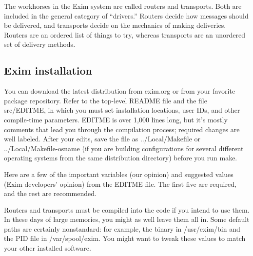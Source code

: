 The workhorses in the Exim system are called routers and transports.
Both are included in the general category of ``drivers.'' Routers decide
how messages should be delivered, and transports decide on the mechanics
of making deliveries. Routers are an ordered list of things to try,
whereas transports are an unordered set of delivery methods.

\protect\hypertarget{part0026_split_041.html}{}{}

\hypertarget{part0026_split_041.htmlux5cux23_idContainer1247}{}
\hypertarget{part0026_split_041.htmlux5cux23calibre_pb_40}{%
\subsection[Exim
installation]{\texorpdfstring{\protect\hypertarget{part0026_split_041.htmlux5cux23_idTextAnchor1127}{}{}Exim
installation}{Exim installation}}\label{part0026_split_041.htmlux5cux23calibre_pb_40}}

\protect\hypertarget{part0026_split_041.htmlux5cux23_idIndexMarker2610}{}{}You
can download the latest distribution from exim.org or from your favorite
package repository. Refer to the top-level {README} file and the file
{src/EDITME}, in which you must set installation locations, user IDs,
and other compile-time parameters. {EDITME} is over 1,000 lines long,
but it's mostly comments that lead you through the compilation process;
required changes are well labeled. After your edits, save the file as
{../Local/Makefile }or {../Local/Makefile-}{osname}{ }(if you are
building configurations for several different operating systems from the
same distribution directory) before you run {make}.

\protect\hypertarget{part0026_split_041.htmlux5cux23_idIndexMarker2611}{}{}Here
are a few of the important variables (our opinion) and suggested values
(Exim developers' opinion) from the {EDITME} file. The first five are
required, and the rest are
recommended.\protect\hypertarget{part0026_split_041.htmlux5cux23_idIndexMarker2612}{}{}\protect\hypertarget{part0026_split_041.htmlux5cux23_idIndexMarker2613}{}{}\protect\hypertarget{part0026_split_041.htmlux5cux23_idIndexMarker2614}{}{}\protect\hypertarget{part0026_split_041.htmlux5cux23_idIndexMarker2615}{}{}\protect\hypertarget{part0026_split_041.htmlux5cux23_idIndexMarker2616}{}{}


Routers and transports must be compiled into the code if you intend to
use them. In these days of large memories, you might as well leave them
all in. Some default paths are certainly nonstandard: for example, the
binary in {/usr/exim/bin} and the PID file in {/var/spool/exim}. You
might want to tweak these values to match your other installed software.

